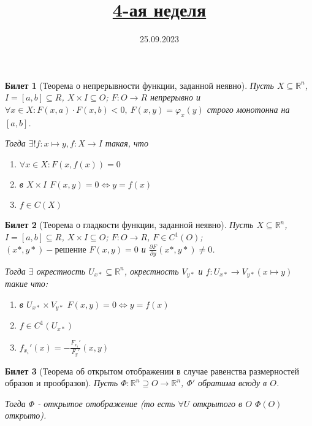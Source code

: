 \documentclass[11pt,a4paper,oneside]{scrartcl}
\title{\href{https://www.youtube.com/live/3aDNqz7KMPg?si=9vZt3tPeb37o5JFc}{4-ая неделя}}
\date{25.09.2023}
\newtheorem{ticket}{Билет}
\begin{document}
\pagestyle{empty}

\maketitle

\setcounter{ticket}{11}
\addtocounter{ticket}{-1}
\begin{ticket}[Теорема о непрерывности функции, заданной неявно]
    Пусть $X \subseteq \mathbb{R}^n$, $I = [a, b] \subseteq R$, $X \times I \subseteq O$;
    $F: O \rightarrow R$ непрерывно и $\forall x \in X: F(x, a) \cdot F(x, b) < 0, \
    F(x, y) = \varphi_x (y)$ строго монотонна на $[a, b]$.

    Тогда $\exists! f: x \mapsto y, f: X \rightarrow I$ такая, что
    \begin{enumerate}
        \item $\forall x \in X: F(x, f(x)) = 0$
        \item в $X \times I$ $F(x, y) = 0 \Leftrightarrow y = f(x)$
        \item $f \in C(X)$
    \end{enumerate}
\end{ticket}

\begin{ticket}[Теорема о гладкости функции, заданной неявно]
    Пусть $X \subseteq \mathbb{R}^n$, $I = [a, b] \subseteq R$, $X \times I \subseteq O$;
    $F: O \rightarrow R$, $F \in C^1(O)$;
    $(x*, y*) - \text{решение } F(x, y) = 0$ и $\frac{\partial F}{\partial y} (x*, y*) \neq 0$.

    Тогда $\exists$ окрестность $U_{x*} \subseteq \mathbb{R}^n$, окрестность $V_{y*}$
    и $f: U_{x*} \rightarrow V_{y*} (x \mapsto y)$ такие что:
    \begin{enumerate}
        \item в $U_{x*} \times V_{y*}$ $F(x, y) = 0 \Leftrightarrow y = f(x)$
        \item $f \in C^1(U_{x*})$
        \item $f_{x_i}'(x) = - \frac{F_{x_i}'}{F_y'} (x, y)$
    \end{enumerate}
\end{ticket}

\begin{ticket}[Теорема об открытом отображении в случае равенства размерностей образов и прообразов]
    Пусть $\Phi: \mathbb{R}^n \supseteq O \rightarrow \mathbb{R}^n$, $\Phi'$ обратима всюду в $O$.

    Тогда $\Phi$ - открытое отображение (то есть $\forall U$ открытого в $O$ $\Phi(O)$ открыто).
\end{ticket}
\end{document}

